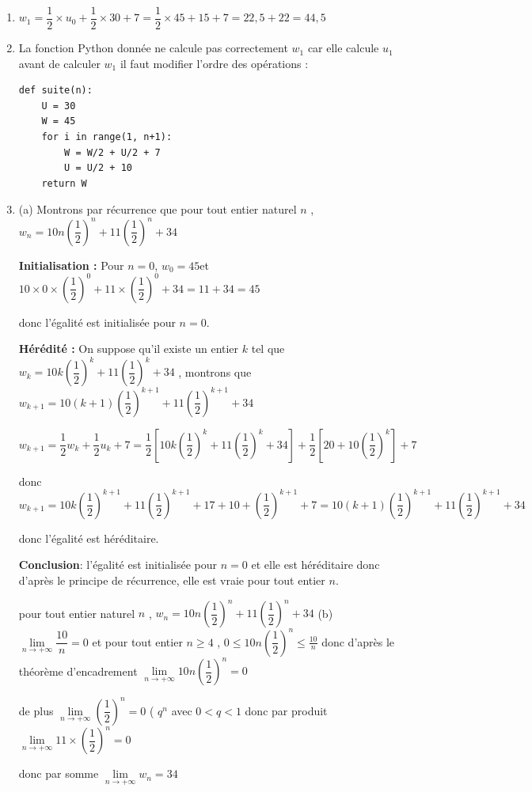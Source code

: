 \documentclass[10pt]{article}
\begin{document}
\begin{enumerate}
    \item $w_1= \dfrac{1}{2} \times u_0 + \dfrac{1}{2} \times 30 + 7 = \dfrac{1}{2} \times 45 + 15 + 7 = 22,5 +22 = 44,5$

    \item La fonction Python donnée ne calcule pas correctement \( w_1 \) car elle calcule $u_1$ avant de calculer $w_1$ il faut modifier l’ordre des opérations :
 
\begin{verbatim}
def suite(n):
    U = 30
    W = 45
    for i in range(1, n+1):
        W = W/2 + U/2 + 7
        U = U/2 + 10
    return W
\end{verbatim}

    \item (a) Montrons par récurrence  que pour tout entier naturel $n$ , 
   $ w_n = 10n \left( \dfrac{1}{2} \right)^n + 11 \left( \dfrac{1}{2} \right)^n + 34$

    \textbf{Initialisation :} Pour \( n = 0 \),
    $ w_0 =45 $et $  10 \times 0 \times \left( \dfrac{1}{2} \right)^0 + 11 \times \left( \dfrac{1}{2} \right)^0 + 34 =11+34= 45$

donc l'égalité est initialisée pour $n=0$.

 \textbf{Hérédité :} On suppose qu'il existe un entier $k$ tel que $w_k = 10k \left( \dfrac{1}{2} \right)^k + 11 \left( \dfrac{1}{2} \right)^k + 34$ , montrons que  $w_{k+1} = 10(k+1) \left( \dfrac{1}{2} \right)^{k+1} + 11 \left( \dfrac{1}{2} \right)^{k+1} + 34$

$ w_{k+1} = \dfrac{1}{2}w_k + \dfrac{1}{2}u_k + 7 = \dfrac{1}{2} \left[ 10k \left( \dfrac{1}{2} \right)^k + 11 \left( \dfrac{1}{2} \right)^k + 34 \right] + \dfrac{1}{2} \left[ 20 + 10 \left( \dfrac{1}{2} \right)^k \right] + 7$

donc $ w_{k+1} = 10k \left( \dfrac{1}{2} \right)^{k+1} + 11 \left( \dfrac{1}{2} \right)^{k+1} + 17 +10 +   \left( \dfrac{1}{2} \right)^{k+1}+ 7 = 10(k+1) \left( \dfrac{1}{2} \right)^{k+1} + 11 \left( \dfrac{1}{2} \right)^{k+1} + 34$

donc l'égalité est héréditaire.

\textbf{Conclusion}: l'égalité est initialisée pour $n=0$ et elle est héréditaire donc d'après le principe de récurrence, elle est vraie pour tout entier $n$.

pour tout entier naturel $n$ , $ w_n = 10n \left( \dfrac{1}{2} \right)^n + 11 \left( \dfrac{1}{2} \right)^n + 34$
 (b)  $\lim\limits_{n \to +\infty} \dfrac{10}{n}=0$ et pour tout entier $n \geqslant 4$ , $0 \leqslant 10n \left( \dfrac{1}{2} \right)^n \leqslant \frac{10}{n}$ donc d'après le théorème d'encadrement $\lim\limits_{n \to +\infty}10n \left( \dfrac{1}{2} \right)^n=0$ 

de plus $\lim\limits_{n \to +\infty}  \left( \dfrac{1}{2} \right)^n =0$ ( $q^n$ avec $0<q<1$ donc par produit $\lim\limits_{n \to +\infty} 11 \times  \left( \dfrac{1}{2} \right)^n =0$

donc par somme $\lim\limits_{n \to +\infty} w_n=34$
\end{enumerate}

\bigskip
\end{document}

